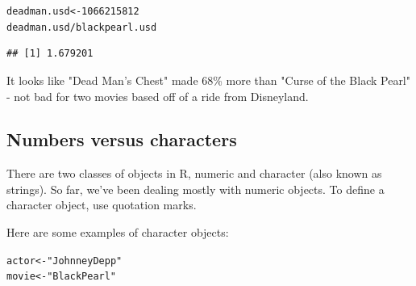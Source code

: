 \documentclass{tufte-book}\usepackage[]{graphicx}\usepackage[]{color}
\makeatletter
\newcommand{\hlnum}[1]{\textcolor[rgb]{0.686,0.059,0.569}{#1}}%
\newcommand{\hlstr}[1]{\textcolor[rgb]{0.192,0.494,0.8}{#1}}%
\newcommand{\hlopt}[1]{\textcolor[rgb]{0,0,0}{#1}}%
\newcommand{\hlstd}[1]{\textcolor[rgb]{0.345,0.345,0.345}{#1}}%
\newcommand{\hlkwb}[1]{\textcolor[rgb]{0.69,0.353,0.396}{#1}}%
\newenvironment{kframe}{%
 \def\at@end@of@kframe{}%
 \ifinner\ifhmode%
  \def\at@end@of@kframe{\end{minipage}}%
  \begin{minipage}{\columnwidth}%
 \fi\fi%
 \def\FrameCommand##1{\hskip\@totalleftmargin \hskip-\fboxsep
 \colorbox{shadecolor}{##1}\hskip-\fboxsep
     \hskip-\linewidth \hskip-\@totalleftmargin \hskip\columnwidth}%
 \MakeFramed {\advance\hsize-\width
   \@totalleftmargin\z@ \linewidth\hsize
   \@setminipage}}%
 {\par\unskip\endMakeFramed%
 \at@end@of@kframe}
\newenvironment{knitrout}{}{} %
\makeatother
\begin{document}
\begin{knitrout}
\color{fgcolor}\begin{kframe}
\begin{alltt}
\hlstd{deadman.usd} \hlkwb{<-} \hlnum{1066215812}
\hlstd{deadman.usd} \hlopt{/} \hlstd{blackpearl.usd}
\end{alltt}
\begin{verbatim}
## [1] 1.679201
\end{verbatim}
\end{kframe}
\end{knitrout}

It looks like "Dead Man's Chest" made 68\% more than "Curse of the Black Pearl" - not bad for two movies based off of a ride from Disneyland.

\subsection{Numbers versus characters}

There are two classes of objects in R, numeric and character (also known as strings). So far, we've been dealing mostly with numeric objects. To define a character object, use quotation marks.

Here are some examples of character objects:

\begin{knitrout}
\color{fgcolor}\begin{kframe}
\begin{alltt}
\hlstd{actor} \hlkwb{<-} \hlstr{"Johnney Depp"}
\hlstd{movie} \hlkwb{<-} \hlstr{"Black Pearl"}
\end{alltt}
\end{kframe}
\end{knitrout}


\end{document}

